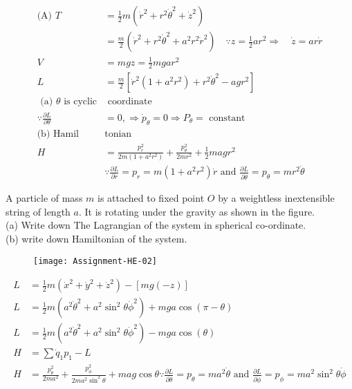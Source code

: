 	\begin{answer}
	\begin{align*}
	\text{(A) }T&=\frac{1}{2} m\left(\dot{r}^{2}+r^{2} \dot{\theta}^{2}+\dot{z}^{2}\right)\\&=\frac{m}{2}\left(\dot{r}^{2}+r^{2} \dot{\theta}^{2}+a^{2} r^{2} \dot{r}^{2}\right) \quad \because z=\frac{1}{2} a r^{2} \Rightarrow \quad \dot{z}=a r \dot{r}\\
	V&=m g z=\frac{1}{2} m g a r^{2} \\
	L&=\frac{m}{2}\left[\dot{r}^{2}\left(1+a^{2} r^{2}\right)+r^{2} \dot{\theta}^{2}-a g r^{2}\right]\\
	\text{	(a) $\theta$ is cyclic}&\text{ coordinate}\\
	\because \frac{\partial L}{\partial \theta}&=0, \Rightarrow \dot{p}_{\theta}=0 \Rightarrow P_{\theta}=\text{ constant}\\
	\text{(b) Hamil}&\text{tonian}\\
	H&=\frac{p_{r}^{2}}{2 m\left(1+a^{2} r^{2}\right)}+\frac{p_{\theta}^{2}}{2 m r^{2}}+\frac{1}{2} m a g r^{2} \quad \\&\because \frac{\partial L}{\partial \dot{r}}=p_{r}=m\left(1+a^{2} r^{2}\right) \dot{r}\text{ and }\frac{\partial L}{\partial \dot{\theta}}=p_{\theta}=m r^{2} \dot{\theta}
	\end{align*}
\end{answer}
\begin{exercise}
	A particle of mass $m$ is attached to fixed point $O$ by a weightless inextensible string of length $a$. It is rotating under the gravity as shown in the figure.\\
	(a) Write down The Lagrangian of the system in spherical co-ordinate.\\
	(b) write down Hamiltonian of the system.
	\begin{figure}[H]
		\centering
		\texttt{[image: Assignment-HE-02]}
	\end{figure}
\end{exercise}
	\begin{answer}
	\begin{align*}
	L&=\frac{1}{2} m\left(\dot{x}^{2}+\dot{y}^{2}+\dot{z}^{2}\right)-[m g(-z)]\\
	L&=\frac{1}{2} m\left(a^{2} \dot{\theta}^{2}+a^{2} \sin ^{2} \theta \dot{\phi}^{2}\right)+m g a \cos (\pi-\theta)\\
	L&=\frac{1}{2} m\left(a^{2} \dot{\theta}^{2}+a^{2} \sin ^{2} \theta \dot{\phi}^{2}\right)-m g a \cos (\theta)\\
	H&=\sum \dot{q}_{1} p_{1}-L\\
	H&=\frac{p_{\theta}^{2}}{2 m a^{2}}+\frac{p_{\phi}^{2}}{2 m a^{2} \sin ^{2} \theta}+m a g \cos \theta \because \frac{\partial L}{\partial \dot{\theta}}=p_{\theta}=m a^{2} \dot{\theta}\text{ and } \frac{\partial L}{\partial \dot{\phi}}=p_{\phi}=m a^{2} \sin ^{2} \theta \dot{\phi}
	\end{align*}
\end{answer}
